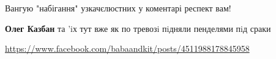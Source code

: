 \begin{itemize}
Вангую "набігання" узкачєлюстних у коментарі \Smiley[1.0][yellow] респект вам!

\begin{itemize}
 
\textbf{Олег Казбан} та 'iх тут вже як по тревозi пiдняли пенделями пiд сраки 🤷🤣
\end{itemize}

 
\url{https://www.facebook.com/babaandkit/posts/4511988178845958} \Smiley[1.0][yellow]

\end{itemize}

